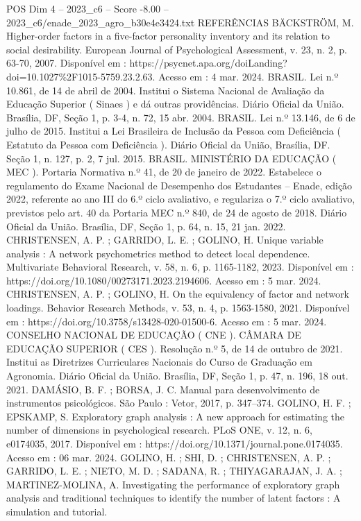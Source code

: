 \begin{textsample}{POS Dim 4 – 2023\_c6 – Score -8.00 – 2023\_c6/enade\_2023\_agro\_b30e4e3424.txt}
REFERÊNCIAS BÄCKSTRÖM, M.
Higher-order factors in a five-factor personality inventory and its relation to social desirability.
European Journal of Psychological Assessment, v. 23, n. 2, p. 63-70, 2007.
Disponível em : https://psycnet.apa.org/doiLanding? doi=10.1027\%2F1015-5759.23.2.63.
Acesso em : 4 mar. 2024.
BRASIL.
Lei n.º 10.861, de 14 de abril de 2004.
Institui o Sistema Nacional de Avaliação da Educação Superior ( Sinaes ) e dá outras providências.
Diário Oficial da União.
Brasília, DF, Seção 1, p. 3-4, n. 72, 15 abr. 2004.
BRASIL.
Lei n.º 13.146, de 6 de julho de 2015.
Institui a Lei Brasileira de Inclusão da Pessoa com Deficiência ( Estatuto da Pessoa com Deficiência ).
Diário Oficial da União, Brasília, DF.
Seção 1, n. 127, p. 2, 7 jul. 2015.
BRASIL.
MINISTÉRIO DA EDUCAÇÃO ( MEC ).
Portaria Normativa n.º 41, de 20 de janeiro de 2022.
Estabelece o regulamento do Exame Nacional de Desempenho dos Estudantes – Enade, edição 2022, referente ao ano III do 6.º ciclo avaliativo, e regulariza o 7.º ciclo avaliativo, previstos pelo art. 40 da Portaria MEC n.º 840, de 24 de agosto de 2018.
Diário Oficial da União.
Brasília, DF, Seção 1, p. 64, n. 15, 21 jan. 2022.
CHRISTENSEN, A.
P. ; GARRIDO, L.
E. ; GOLINO, H.
Unique variable analysis : A network psychometrics method to detect local dependence.
Multivariate Behavioral Research, v. 58, n. 6, p. 1165-1182, 2023.
Disponível em : https://doi.org/10.1080/00273171.2023.2194606.
Acesso em : 5 mar. 2024.
CHRISTENSEN, A.
P. ; GOLINO, H.
On the equivalency of factor and network loadings.
Behavior Research Methods, v. 53, n. 4, p. 1563-1580, 2021.
Disponível em : https://doi.org/10.3758/s13428-020-01500-6.
Acesso em : 5 mar. 2024.
CONSELHO NACIONAL DE EDUCAÇÃO ( CNE ).
CÂMARA DE EDUCAÇÃO SUPERIOR ( CES ).
Resolução n.º 5, de 14 de outubro de 2021.
Institui as Diretrizes Curriculares Nacionais do Curso de Graduação em Agronomia.
Diário Oficial da União.
Brasília, DF, Seção 1, p. 47, n. 196, 18 out. 2021.
DAMÁSIO, B.
F. ; BORSA, J.
C.
Manual para desenvolvimento de instrumentos psicológicos.
São Paulo : Vetor, 2017, p. 347–374.
GOLINO, H.
F. ; EPSKAMP, S.
Exploratory graph analysis : A new approach for estimating the number of dimensions in psychological research.
PLoS ONE, v. 12, n. 6, e0174035, 2017.
Disponível em : https://doi.org/10.1371/journal.pone.0174035.
Acesso em : 06 mar. 2024.
GOLINO, H. ; SHI, D. ; CHRISTENSEN, A.
P. ; GARRIDO, L.
E. ; NIETO, M.
D. ; SADANA, R. ; THIYAGARAJAN, J.
A. ; MARTINEZ-MOLINA, A.
Investigating the performance of exploratory graph analysis and traditional techniques to identify the number of latent factors : A simulation and tutorial.

\end{textsample}

